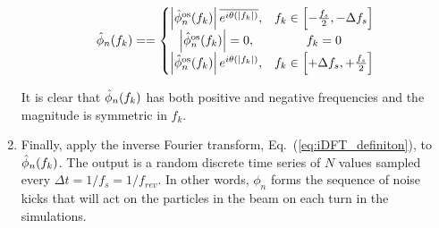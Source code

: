 \begin{enumerate}
    \begin{equation}
        \hat{\phi}_n(f_k) = = \left\{\begin{matrix}
   \left | \hat{\phi}_n^\mathrm{os}(f_k) \right | \overline{e^{{i}\theta (\mid f_k \mid)}}, & f_k \in \left [-\frac{f_s}{2}, -\Delta f_s \right] \\ 
    \left | \hat{\phi}_n^\mathrm{os}(f_k) \right | = 0, & f_k=0  \\
   \left | \hat{\phi}_n^\mathrm{os}(f_k) \right | e^{{i}\theta (\mid f_k \mid)}, & f_k \in \left [+ \Delta f_s, + \frac{f_s}{2} \right]  
    \end{matrix}\right.
    \end{equation}

    It is clear that $\hat{\phi}_n(f_k)$ has both positive and negative frequencies and the magnitude is symmetric in $f_k$.
    
    \item Finally, apply the inverse Fourier transform, Eq.~(\ref{eq:iDFT_definiton}), to $\hat{\phi}_n(f_k)$. The  output  is  a  random  discrete  time  series of $N$ values sampled every $\Delta t = 1/f_s=1/f_{rev}$. In other words, $\phi_n$ forms the sequence of noise kicks that will act on the particles in the beam on each turn in the simulations.

\end{enumerate} 

